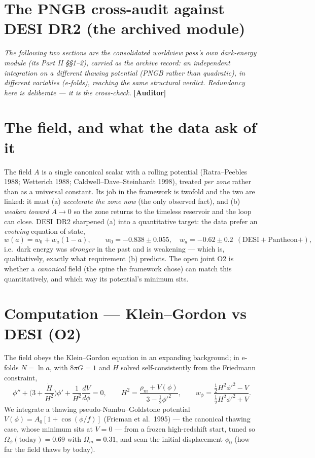 \documentclass[11pt]{article}
\newcommand{\Auditor}{\textbf{\textcolor{teal!55!black}{[Auditor]}}}
\begin{document}
\section{The PNGB cross-audit against DESI DR2 (the archived module)}
\emph{The following two sections are the consolidated worldview pass's own dark-energy module (its Part II \S\S1--2), carried as the archive record: an independent integration on a different thawing potential (PNGB rather than quadratic), in different variables (e-folds), reaching the same structural verdict. Redundancy here is deliberate --- it is the cross-check.} \Auditor

\section{The field, and what the data ask of it}
The field $A$ is a single canonical scalar with a rolling potential (Ratra--Peebles 1988; Wetterich 1988; Caldwell--Dave--Steinhardt 1998), treated \emph{per zone} rather than as a universal constant. Its job in the framework is twofold and the two are linked: it must (a) \emph{accelerate the zone now} (the only observed fact), and (b) \emph{weaken toward $A\!\to\!0$} so the zone returns to the timeless reservoir and the loop can close. DESI~DR2 sharpened (a) into a quantitative target: the data prefer an \emph{evolving} equation of state,
\begin{equation}
w(a)=w_0+w_a(1-a),\qquad w_0=-0.838\pm0.055,\quad w_a=-0.62\pm0.2\ \ (\text{DESI}+\text{Pantheon+}),
\end{equation}
i.e.\ dark energy was \emph{stronger} in the past and is weakening --- which is, qualitatively, exactly what requirement (b) predicts. The open joint O2 is whether a \emph{canonical} field (the spine the framework chose) can match this quantitatively, and which way its potential's minimum sits.

\section{Computation --- Klein--Gordon vs DESI (O2)}
The field obeys the Klein--Gordon equation in an expanding background; in e-folds $N=\ln a$, with $8\pi G=1$ and $H$ solved self-consistently from the Friedmann constraint,
\begin{equation}
\phi''+\Big(3+\frac{\dot H}{H^2}\Big)\phi'+\frac{1}{H^2}\frac{dV}{d\phi}=0,\qquad
H^2=\frac{\rho_m+V(\phi)}{3-\tfrac12\phi'^2},\qquad
w_\phi=\frac{\tfrac12 H^2\phi'^2-V}{\tfrac12 H^2\phi'^2+V}.
\end{equation}
We integrate a thawing pseudo-Nambu--Goldstone potential $V(\phi)=A_0[1+\cos(\phi/f)]$ (Frieman et al.\ 1995) --- the canonical thawing case, whose minimum sits at $V=0$ --- from a frozen high-redshift start, tuned so $\Omega_\phi(\text{today})=0.69$ with $\Omega_m=0.31$, and scan the initial displacement $\phi_0$ (how far the field thaws by today).
\end{document}
